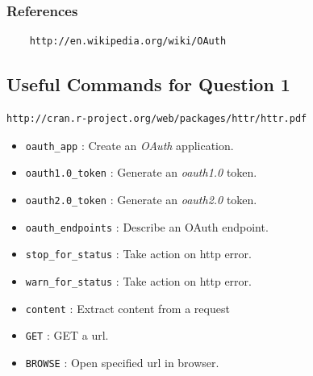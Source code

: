 \subsubsection*{References}
	\begin{verbatim}
	http://en.wikipedia.org/wiki/OAuth
	\end{verbatim}


\newpage
\subsection*{Useful Commands for Question 1}

\begin{framed}
\begin{verbatim}
http://cran.r-project.org/web/packages/httr/httr.pdf
\end{verbatim}
\end{framed}
\begin{itemize}
	
	
	\item \texttt{oauth\_app} : Create an \textit{OAuth} application.
	
	\item \texttt{oauth1.0\_token} : Generate an \textit{oauth1.0} token.
	
	\item \texttt{oauth2.0\_token} : Generate an \textit{oauth2.0} token.

	\item \texttt{oauth\_endpoints} : Describe an OAuth endpoint.
	
	
	
	\item \texttt{stop\_for\_status} : Take action on http error.
 
    \item \texttt{warn\_for\_status} : Take action on http error.
	
	\item \texttt{content} : Extract content from a request
	
	\item \texttt{GET} : GET a url.
	
	\item \texttt{BROWSE} : Open specified url in browser.

\end{itemize}
\newpage

